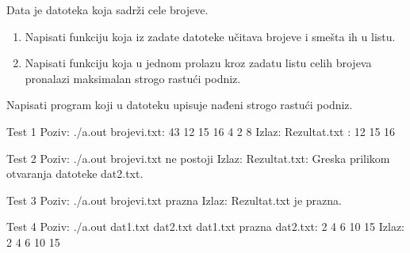 \begin{Exercise}[label=611]
Data je datoteka  koja sadrži cele brojeve.
\begin{enumerate}
 \item Napisati funkciju koja iz zadate datoteke učitava brojeve i smešta ih u listu.
 \item Napisati funkciju koja u jednom prolazu kroz zadatu listu celih brojeva 
pronalazi maksimalan strogo rastući podniz.
\end{enumerate}
Napisati program koji u datoteku  upisuje nađeni strogo rastući podniz.

\noindent
\begin{miditest}
\begin{test}{Test 1}
Poziv: ./a.out
brojevi.txt:
  43 12 15 16 4 2 8
Izlaz: 
Rezultat.txt : 
  12 15 16
\end{test}
\end{miditest}
\begin{miditest}
\begin{test}{Test 2}
Poziv: ./a.out
brojevi.txt ne postoji
Izlaz:
Rezultat.txt: 
  Greska prilikom otvaranja datoteke 
  dat2.txt.
\end{test}
\end{miditest}
\begin{miditest}
\begin{test}{Test 3}
Poziv: ./a.out 
brojevi.txt prazna
Izlaz: 
Rezultat.txt  je prazna.
\end{test}
\end{miditest}
\begin{miditest}
\begin{test}{Test 4}
Poziv: ./a.out dat1.txt dat2.txt
dat1.txt prazna
dat2.txt: 
  2 4 6 10 15
Izlaz:
  2 4 6 10 15
\end{test}
\end{miditest}

\end{Exercise}
\begin{Answer}[ref=611]
\end{Answer}

